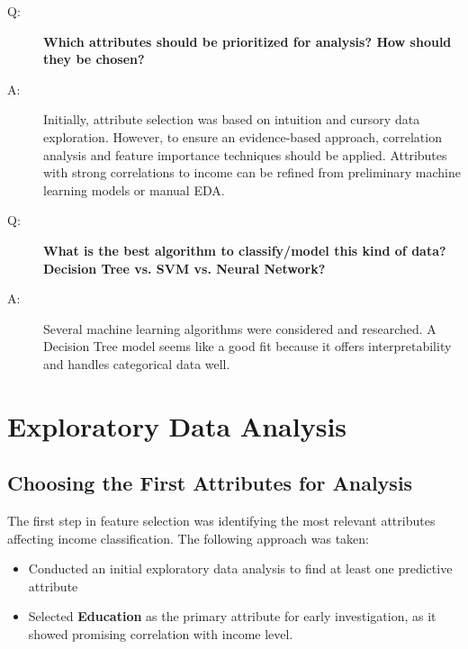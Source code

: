 \documentclass[journal,onecolumn]{IEEEtran}
\begin{document}
\begin{description}
    \item[Q:] \textbf{Which attributes should be prioritized for analysis? How should they be chosen?}
    \item[A:] Initially, attribute selection was based on intuition and cursory data exploration. However, to ensure an evidence-based approach, correlation analysis and feature importance techniques should be applied. Attributes with strong correlations to income can be refined from preliminary machine learning models or manual EDA.

    \item[Q:] \textbf{What is the best algorithm to classify/model this kind of data? Decision Tree vs. SVM vs. Neural Network?}
    \item[A:] Several machine learning algorithms were considered and researched. A Decision Tree model seems like a good fit because it offers interpretability and handles categorical data well.

\end{description}

\section{Exploratory Data Analysis}

\subsection{Choosing the First Attributes for Analysis}
The first step in feature selection was identifying the most relevant attributes affecting income classification. The following approach was taken:
\begin{itemize}
    \item Conducted an initial exploratory data analysis to find at least one predictive attribute
    \item Selected \textbf{Education} as the primary attribute for early investigation, as it showed promising correlation with income level.
\end{itemize}
\end{document}
